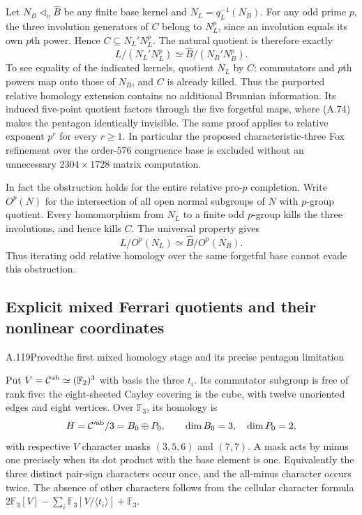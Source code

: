 Let $N_B\triangleleft_o\widehat B$ be any finite base kernel
and $N_L=q_L^{-1}(N_B)$. For any odd prime $p$, the three
involution generators of $C$ belong to $N_L^p$, since an
involution equals its own $p$th power. Hence
$C\subseteq N_L'N_L^p$. The natural quotient is therefore
exactly
\[
 \boxed{\quad L/(N_L'N_L^p)
           \simeq\widehat B/(N_B'N_B^p).\quad}
 \tag{FP.40.2}
\]
To see equality of the indicated kernels, quotient $N_L$ by
$C$: commutators and $p$th powers map onto those of $N_B$,
and $C$ is already killed. Thus the purported relative homology
extension contains no additional Brunnian information. Its
induced five-point quotient factors through the five forgetful
maps, where (A.74) makes the pentagon identically invisible.
The same proof applies to relative exponent $p^r$ for every
$r\geq1$. In particular the proposed characteristic-three
Fox refinement over the order-$576$ congruence base is excluded
without an unnecessary $2304\times1728$ matrix computation.

In fact the obstruction holds for the entire relative pro-$p$
completion. Write $O^p(N)$ for the intersection of all open
normal subgroups of $N$ with $p$-group quotient. Every homomorphism
from $N_L$ to a finite odd $p$-group kills the three involutions,
and hence kills $C$. The universal property gives
\[
 L/O^p(N_L)\simeq\widehat B/O^p(N_B).
 \tag{FP.40.3}
\]
Thus iterating odd relative homology over the same forgetful
base cannot evade this obstruction.

\subsection{Explicit mixed Ferrari quotients and their nonlinear coordinates}


\begin{statement}{A.119}{Proved}{the first mixed homology stage and its precise pentagon limitation}
\end{statement}
Put $V=\mathcal C^{\rm ab}\simeq(\mathbb F_2)^3$ with
basis the three $t_i$. Its commutator subgroup is free of
rank five: the eight-sheeted Cayley covering is the cube,
with twelve unoriented edges and eight vertices.
Over $\mathbb F_3$, its homology is
\[
 H=\mathcal C'^{\rm ab}/3
   =B_0\oplus P_0,
 \qquad\dim B_0=3,\quad\dim P_0=2,
\]
with respective $V$ character masks
$(3,5,6)$ and $(7,7)$. A mask acts by minus one precisely
when its dot product with the base element is one.
Equivalently the three distinct pair-sign characters occur
once, and the all-minus character occurs twice.
The absence of other characters follows from the cellular
character formula
$2\mathbb F_3[V]-\sum_i\mathbb F_3[V/\langle t_i\rangle]
 +\mathbb F_3$.

